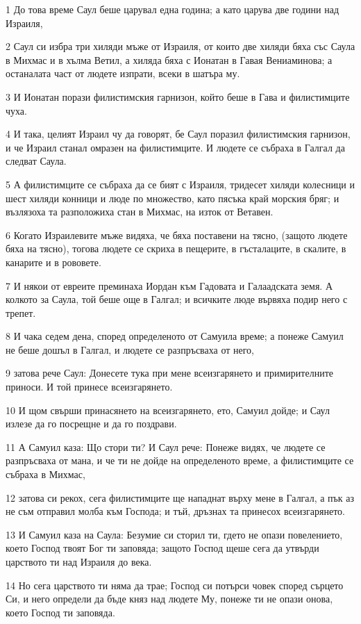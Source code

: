 \par 1 До това време Саул беше царувал една година; а като царува две години над Израиля,
\par 2 Саул си избра три хиляди мъже от Израиля, от които две хиляди бяха със Саула в Михмас и в хълма Ветил, а хиляда бяха с Ионатан в Гавая Вениаминова; а останалата част от людете изпрати, всеки в шатъра му.
\par 3 И Ионатан порази филистимския гарнизон, който беше в Гава и филистимците чуха.
\par 4 И така, целият Израил чу да говорят, бе Саул поразил филистимския гарнизон, и че Израил станал омразен на филистимците. И людете се събраха в Галгал да следват Саула.
\par 5 А филистимците се събраха да се бият с Израиля, тридесет хиляди колесници и шест хиляди конници и люде по множество, като пясъка край морския бряг; и възлязоха та разположиха стан в Михмас, на изток от Ветавен.
\par 6 Когато Израилевите мъже видяха, че бяха поставени на тясно, (защото людете бяха на тясно), тогова людете се скриха в пещерите, в гъсталаците, в скалите, в канарите и в рововете.
\par 7 И някои от евреите преминаха Иордан към Гадовата и Галаадската земя. А колкото за Саула, той беше още в Галгал; и всичките люде вървяха подир него с трепет.
\par 8 И чака седем дена, според определеното от Самуила време; а понеже Самуил не беше дошъл в Галгал, и людете се разпръсваха от него,
\par 9 затова рече Саул: Донесете тука при мене всеизгарянето и примирителните приноси. И той принесе всеизгарянето.
\par 10 И щом свърши принасянето на всеизгарянето, ето, Самуил дойде; и Саул излезе да го посрещне и да го поздрави.
\par 11 А Самуил каза: Що стори ти? И Саул рече: Понеже видях, че людете се разпръсваха от мана, и че ти не дойде на определеното време, а филистимците се събраха в Михмас,
\par 12 затова си рекох, сега филистимците ще нападнат върху мене в Галгал, а пък аз не съм отправил молба към Господа; и тъй, дръзнах та принесох всеизгарянето.
\par 13 И Самуил каза на Саула: Безумие си сторил ти, гдето не опази повелението, което Господ твоят Бог ти заповяда; защото Господ щеше сега да утвърди царството ти над Израиля до века.
\par 14 Но сега царството ти няма да трае; Господ си потърси човек според сърцето Си, и него определи да бъде княз над людете Му, понеже ти не опази онова, което Господ ти заповяда.
